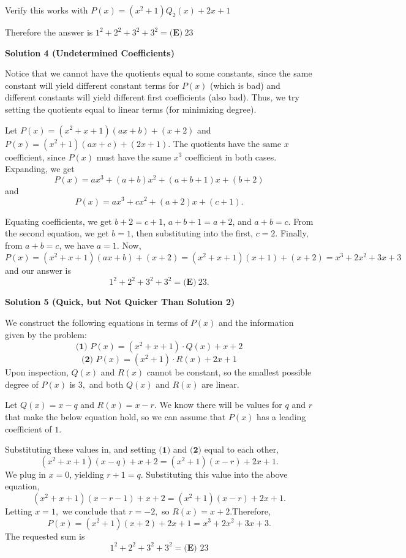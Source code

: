 \begin{enumerate}
 Verify this works with $P(x) = (x^2+1)Q_2(x) + 2x + 1$

 Therefore the answer is $1^2 + 2^2 + 3^2 + 3^2 = \boxed{\textbf{(E)} \ 23}$




\textbf{Solution 4 (Undetermined Coefficients)}

Notice that we cannot have the quotients equal to some constants, since the same constant will yield different constant terms for $P(x)$ (which is bad) and different constants will yield different first coefficients (also bad). Thus, we try setting the quotients equal to linear terms (for minimizing degree).

 Let $P(x)=(x^2+x+1)(ax+b)+(x+2)$ and $P(x)=(x^2+1)(ax+c)+(2x+1)$. The quotients have the same $x$ coefficient, since $P(x)$ must have the same $x^3$ coefficient in both cases. Expanding, we get 
 \[P(x)=ax^3+(a+b)x^2+(a+b+1)x+(b+2)\] and 
 \[P(x)=ax^3+cx^2+(a+2)x+(c+1).\]

 Equating coefficients, we get $b+2=c+1$, $a+b+1=a+2$, and $a+b=c$. From the second equation, we get $b=1$, then substituting into         the first, $c=2$. Finally, from $a+b=c$, we have $a=1$. Now, $P(x)=(x^2+x+1)(ax+b)+(x+2)=(x^2+x+1)(x+1)+(x+2)=x^3+2x^2+3x+3$ and our answer is 
 \[1^2+2^2+3^2+3^2=\boxed{\textbf{(E)} \ 23}.\]




\textbf{Solution 5 (Quick, but Not Quicker Than Solution 2)}

We construct the following equations in terms of $P(x)$ and the information given by the problem:
 \[\textbf{(1) } P(x)=(x^2+x+1)\cdot Q(x)+x+2\]
 \[\textbf{(2) } P(x)=(x^2+1)\cdot R(x)+2x+1\]Upon inspection, $Q(x)$ and $R(x)$ cannot be constant, so the smallest possible degree of $P(x)$ is $3,$ and both $Q(x)$ and $R(x)$ are linear. 

 Let $Q(x)=x-q$ and $R(x)=x-r.$ We know there will be values for $q$ and $r$ that make the below equation hold, so we can assume that $P(x)$ has a leading coefficient of $1$.

 Substituting these values in, and setting $\textbf{(1)}$ and $\textbf{(2)}$ equal to each  other,
 \[(x^2+x+1)(x-q)+x+2=(x^2+1)(x-r)+2x+1.\]We plug in $x=0$, yielding $r+1=q.$ Substituting this value into the above equation, 
 \[(x^2+x+1)(x-r-1)+x+2=(x^2+1)(x-r)+2x+1.\]Letting $x=1,$ we conclude that $r=-2,$ so $R(x)=x+2.$Therefore, 
 \[P(x)=(x^2+1)(x+2)+2x+1 = x^3+2x^2+3x+3.\]The requested sum is 
 \[1^2+2^2+3^2+3^2=\boxed{\textbf{(E) }23}\]


\end{enumerate}
